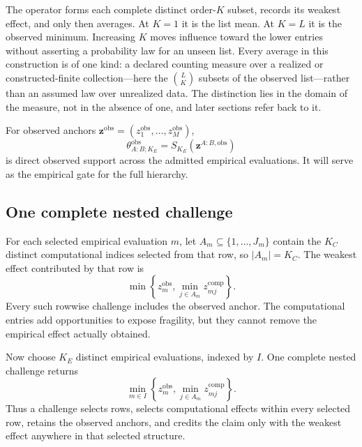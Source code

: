 \documentclass[11pt]{article}
\theoremstyle{remark}
\begin{document}
The operator forms each complete distinct order-$K$ subset, records its weakest
effect, and only then averages. At $K=1$ it is the list mean. At $K=L$ it is
the observed minimum. Increasing $K$ moves influence toward the lower entries
without asserting a probability law for an unseen list. Every average in this
construction is of one kind: a declared counting measure over a realized or
constructed-finite collection---here the $\binom{L}{K}$ subsets of the observed
list---rather than an assumed law over unrealized data. The distinction lies in
the domain of the measure, not in the absence of one, and later sections refer
back to it.

For observed anchors
$\mathbf z^{\mathrm{obs}}=(z_1^{\mathrm{obs}},\ldots,z_M^{\mathrm{obs}})$,
\begin{equation}
\theta^{\mathrm{obs}}_{A:B;K_E}
=
S_{K_E}(\mathbf z^{A:B,\mathrm{obs}})
\label{eq:observed-support}
\end{equation}
is direct observed support across the admitted empirical evaluations.
It will serve as the empirical gate for the full hierarchy.

\subsection{One complete nested challenge}

For each selected empirical evaluation $m$, let
$A_m\subseteq\{1,\ldots,J_m\}$ contain the $K_C$ distinct computational
indices selected from that row, so $|A_m|=K_C$. The weakest effect contributed
by that row is
\[
\min\left\{
z_m^{\mathrm{obs}},
\min_{j\in A_m}z_{mj}^{\mathrm{comp}}
\right\}.
\]
Every such rowwise challenge includes the observed anchor. The computational
entries add opportunities to expose fragility, but they cannot remove the
empirical effect actually obtained.

Now choose $K_E$ distinct empirical evaluations, indexed by $I$. One complete
nested challenge returns
\[
\min_{m\in I}
\left\{
z_m^{\mathrm{obs}},
\min_{j\in A_m}z_{mj}^{\mathrm{comp}}
\right\}.
\]
Thus a challenge selects rows, selects computational effects within every
selected row, retains the observed anchors, and credits the claim only with the
weakest effect anywhere in that selected structure.
\end{document}
